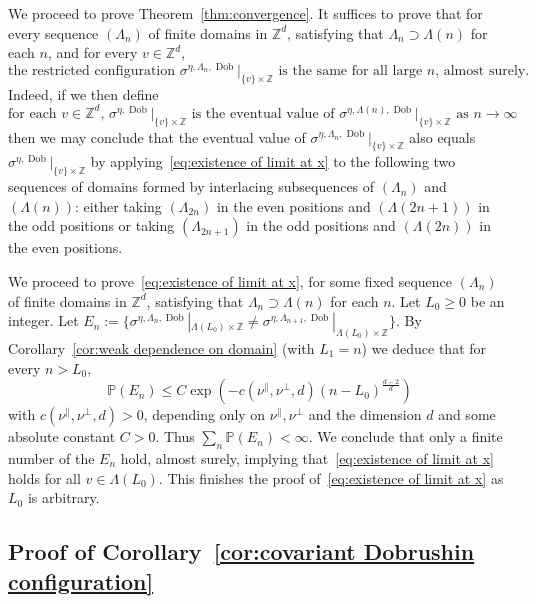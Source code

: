 \documentclass[11pt, reqno]{amsart}
\newcommand{\Z}{\mathbb{Z}}
\DeclareMathOperator{\Dob}{Dob}
\renewcommand{\P}{\mathbb{P}}
\numberwithin{equation}{section}
\begin{document}
We proceed to prove Theorem~\ref{thm:convergence}. It suffices to prove that for every sequence $(\Lambda_n)$ of finite domains in $\Z^d$, satisfying that $\Lambda_n\supset\Lambda(n)$ for each $n$, and for every $v\in\Z^d$,
\begin{equation}
\label{eq:existence of limit at x}
\text{the restricted configuration $\sigma^{\eta,\Lambda_n,\Dob}|_{\{v\}\times\Z}$ is the same for all large $n$, almost surely.}
\end{equation}
Indeed, if we then define
\begin{equation}\label{eq:sigma eta dob def}
    \text{for each $v\in\Z^d$, $\sigma^{\eta,\Dob}|_{\{v\}\times\Z}$ is the eventual value of $\sigma^{\eta,\Lambda(n),\Dob}|_{\{v\}\times\Z}$ as $n\to\infty$}
\end{equation}
then we may conclude that the eventual value of $\sigma^{\eta,\Lambda_n,\Dob}|_{\{v\}\times\Z}$ also equals $\sigma^{\eta,\Dob}|_{\{v\}\times\Z}$ by applying~\eqref{eq:existence of limit at x} to the following two sequences of domains formed by interlacing subsequences of $(\Lambda_n)$ and $(\Lambda(n))$: either taking $(\Lambda_{2n})$ in the even positions and $(\Lambda(2n+1))$ in the odd positions or taking $(\Lambda_{2n+1})$ in the odd positions and $(\Lambda(2n))$ in the even positions.

We proceed to prove~\eqref{eq:existence of limit at x}, for some fixed sequence $(\Lambda_n)$ of finite domains in $\Z^d$, satisfying that $\Lambda_n\supset\Lambda(n)$ for each $n$. Let $L_0\ge 0$ be an integer.
Let $E_n:=\{\sigma^{\eta,\Lambda_n,\Dob}|_{\Lambda(L_0)\times\Z}\ne \sigma^{\eta,\Lambda_{n+1},\Dob}|_{\Lambda(L_0)\times\Z}\}$. By Corollary~\ref{cor:weak dependence on domain} (with $L_1=n$) we deduce that for every $n>L_0$,
\begin{equation}
    \P(E_n)\le C\exp \left(-c(\nu^\parallel,\nu^\perp,d) (n - L_0)^{\frac{d-2}{d}} \right)
\end{equation}
with $c(\nu^\parallel,\nu^\perp,d)>0$, depending only on $\nu^\parallel, \nu^\perp$ and the dimension $d$ and some absolute constant $C>0$. Thus $\sum_n \P(E_n)<\infty$. We conclude that only a finite number of the $E_n$ hold, almost surely, implying that~\eqref{eq:existence of limit at x} holds for all $v\in\Lambda(L_0)$. This finishes the proof of~\eqref{eq:existence of limit at x} as $L_0$ is arbitrary.

\subsection{Proof of Corollary~\ref{cor:covariant Dobrushin configuration}}
\end{document}
